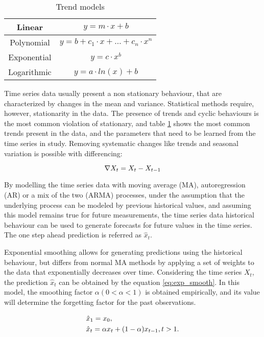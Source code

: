 \begin{table}[h]
\centering
\begin{tabular}{c|c}
Linear      & $y = m \cdot x + b$ \\ \hline
Polynomial  & $y = b + c_1 \cdot x + \dotso + c_n \cdot x^n$  \\ \hline
Exponential & $y = c \cdot  x^b$     \\ \hline
Logarithmic & $y = a \cdot ln(x) + b$
\end{tabular}
\caption{Trend models}
\label{tab:trends_here}
\end{table}

\par Time series data usually present a non stationary behaviour, that are characterized by changes in the mean and variance. Statistical methods require, however,
stationarity in the data. The presence of trends and cyclic behaviours is the most common violation of stationary, and table \ref{tab:trends_here} shows the most 
common trends present in the data, and the parameters that need to be learned from the time series in study. Removing systematic changes like trends and seasonal 
variation is possible with differencing:

\begin {equation*}
\centering
\nabla X_t = X_t - X_{t-1}
\end {equation*}

\par By modelling the time series data with moving average (MA), autoregression (AR) or a mix of the two (ARMA) processes, under the assumption that the underlying
process can be modeled by previous historical values, and assuming this model remains true for future measurements, the time series data historical behaviour can
be used to generate forecasts for future values in the time series. The one step ahead prediction is referred as $\hat{x}_t$.

\par Exponential smoothing allows for generating predictions using the historical behaviour, but differs from normal MA methods by applying a set of weights to the
data that exponentially decreases over time. Considering the time series $X_t$, the prediction $\hat{x}_t$ can be obtained by the equation \ref{eq:exp_smooth}. 
In this model, the smoothing factor $\alpha (0 < \alpha < 1)$ is obtained empirically, and its value will determine the forgetting factor for the past observations.

\begin {equation*}
    \centering
        \begin {split}
            &\hat{x}_1 = x_0, \\
            &\hat{x}_t = \alpha x_{t} + (1-\alpha)x_{t-1}, t > 1.
        \end {split}
    \label{eq:exp_smooth}
\end {equation*}

